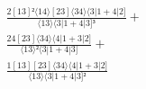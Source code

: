 \documentclass[varwidth, border=5pt]{standalone}
\begin{document}
\begin{my}
$\begin{gathered}
\scriptscriptstyle\frac{2[13]²⟨14⟩[23]⟨34⟩⟨3|1+4|2]}{⟨13⟩⟨3|1+4|3]³} +\\
\scriptscriptstyle\frac{24[23]⟨34⟩⟨4|1+3|2]}{⟨13⟩²⟨3|1+4|3]} +\\
\scriptscriptstyle\frac{1[13][23]⟨34⟩⟨4|1+3|2]}{⟨13⟩⟨3|1+4|3]²} \phantom{+}
\end{gathered}$
\end{my}
\end{document}
